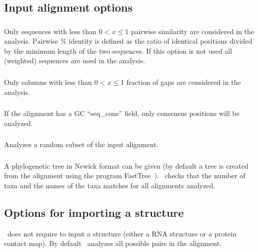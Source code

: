 \subsection{Input alignment options}

\subsubsection{} Only sequences with less than $0<x\leq 1$
pairwise similarity are considered in the analysis.  Pairwise \%
identity is defined as the ratio of identical positions divided by the
minimum length of the two sequences. If this option is not used all
(weighted) sequences are used in the analysis.

\subsubsection{} Only columns with less than $0<x\leq 1$ fraction of gaps are considered in the analysis.

\subsubsection{} If the alignment has a GC ``seq\_cons'' field, only consensus positions will be analyzed.

\subsubsection{} Analyzes a random subset of the input alignment.

\subsubsection{} A phylogenetic tree in Newick format can be given (by default a tree is created 
from the alignment using the program FastTree~\citep{Price10}).  \rscape\ checks that the  number of taxa and the names
of the taxa matches for all alignments analyzed.



\subsection{Options for importing a structure}

\rscape\ does not require to input a structure (either a RNA structure
or a protein contact map). By default \rscape\ analyzes all possible pairs in the alignment.
\vspace{1mm}

